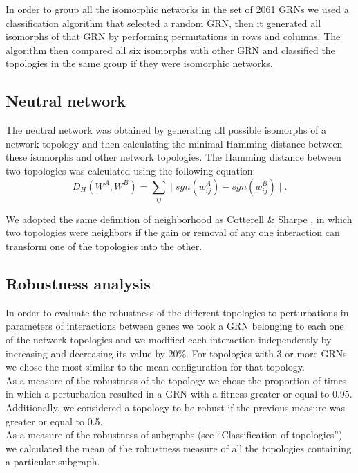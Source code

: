 \documentclass[10pt,letterpaper]{article}
\begin{document}
In order to group all the isomorphic networks in the set of 2061 GRNs we used a
classification algorithm that selected a random GRN, then it generated all 
isomorphs of that GRN by performing permutations in rows and columns. The 
algorithm then compared all six isomorphs with other GRN and classified the 
topologies in the same group if they were isomorphic networks.

\subsection*{Neutral network}

The neutral network was obtained by generating all possible isomorphs of a 
network topology and then calculating the minimal Hamming distance between these
isomorphs and other network topologies. The Hamming distance between two 
topologies was calculated using the following equation:
\begin{equation}
 D_H(W^A, W^B) = \sum_{ij} \mid sgn(w_{ij}^A) - sgn(w^B_{ij}) \mid .
\end{equation}

We adopted the same definition of neighborhood as Cotterell \& Sharpe 
\cite{Cotterell2010}, in which two topologies were neighbors if the gain or 
removal of any one interaction can transform one of the topologies into the 
other.

\subsection*{Robustness analysis}

In order to evaluate the robustness of the different topologies to perturbations
in parameters of interactions between genes we took a GRN belonging to each one 
of the network topologies and we modified each interaction independently by 
increasing and decreasing its value by 20\%. For topologies with 3 or more 
GRNs we chose the most similar to the mean configuration for that topology.\\

As a measure of the robustness of the topology we chose the proportion of times 
in which a perturbation resulted in a GRN with a fitness greater or equal to 
0.95. Additionally, we considered a topology to be robust if the previous 
measure was greater or equal to 0.5.\\

As a measure of the robustness of subgraphs (see “Classification of topologies”)
we calculated the mean of the robustness measure of all the topologies 
containing a particular subgraph.\\
\end{document}
